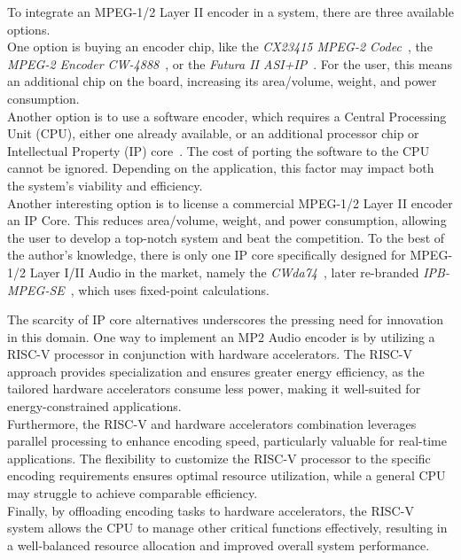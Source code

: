 To integrate an MPEG-1/2 Layer II encoder in a system, there are three available options.\\
One option is buying an encoder chip, like the \textit{CX23415 MPEG-2 Codec}~\cite{cx23415}, the \textit{MPEG-2 Encoder CW-4888}~\cite{cw4888}, or the \textit{Futura II ASI+IP}~\cite{futura}. For the user, this means an additional chip on the board, increasing its area/volume, weight, and power consumption. \\
Another option is to use a software encoder, which requires a Central Processing Unit (CPU), either one already available, or an additional processor chip or Intellectual Property (IP) core~\cite{ipcore}. The cost of porting the software to the CPU cannot be ignored. Depending on the application, this factor may impact both the system's viability and efficiency.\\
Another interesting option is to license a commercial MPEG-1/2 Layer II encoder an IP Core. This reduces area/volume, weight, and power consumption, allowing the user to develop a top-notch system and beat the competition. To the best of the author's knowledge, there is only one IP core specifically designed for MPEG-1/2 Layer I/II Audio in the market, namely the \textit{CWda74}~\cite{CWda74}, later re-branded \textit{IPB-MPEG-SE}~\cite{ipb-mpeg-se}, which uses fixed-point calculations. 

The scarcity of IP core alternatives underscores the pressing need for innovation in this domain. One way to implement an MP2 Audio encoder is by utilizing a RISC-V processor in conjunction with hardware accelerators. The RISC-V approach provides specialization and ensures greater energy efficiency, as the tailored hardware accelerators consume less power, making it well-suited for energy-constrained applications.\\
Furthermore, the RISC-V and hardware accelerators combination leverages parallel processing to enhance encoding speed, particularly valuable for real-time applications. The flexibility to customize the RISC-V processor to the specific encoding requirements ensures optimal resource utilization, while a general CPU may struggle to achieve comparable efficiency. \\
Finally, by offloading encoding tasks to hardware accelerators, the RISC-V system allows the CPU to manage other critical functions effectively, resulting in a well-balanced resource allocation and improved overall system performance.


